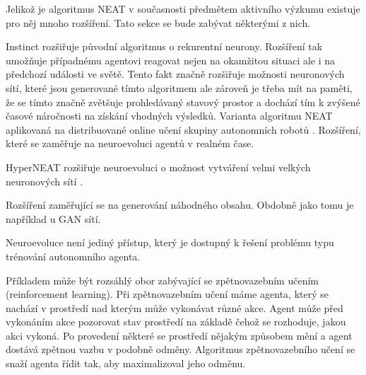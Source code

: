 Jelikož je algoritmus NEAT v současnosti předmětem aktivního výzkumu existuje pro něj mnoho rozšíření. Tato sekce se bude zabývat některými z nich.

Instinct rozšiřuje původní algoritmus o rekurentní neurony. Rozšíření tak umožňuje případnému agentovi reagovat nejen na okamžitou situaci ale i na předchozí události ve světě. Tento fakt značně rozšiřuje možnosti neuronových sítí, které jsou generované tímto algoritmem ale zároveň je třeba mít na paměti, že se tímto značně zvětšuje prohledávaný stavový prostor a dochází tím k zvýšené časové náročnosti na získání vhodných výsledků.
Varianta algoritmu NEAT aplikovaná na distribuované online učení skupiny autonomních robotů \cite[s.~1]{odNEAT}.
Rozšíření, které se zaměřuje na neuroevoluci agentů v realném čase.


HyperNEAT rozšiřuje neuroevoluci o možnost vytváření velmi velkých neuronových sítí \cite[s.~1]{hyperNEAT}.

Rozšíření zaměřující se na generování náhodného obsahu. Obdobně jako tomu je například u GAN sítí.

Neuroevoluce není jediný přístup, který je dostupný k řešení problému typu trénování autonomního agenta.

Příkladem může být rozsáhlý obor zabývající se zpětnovazebním učením (reinforcement learning). Při zpětnovazebním učení máme agenta, který se nachází v prostředí nad kterým může vykonávat různé akce. Agent může před vykonáním akce pozorovat stav prostředí na základě čehož se rozhoduje, jakou akci vykoná. Po provedení některé se prostředí nějakým způsobem mění a agent dostává zpětnou vazbu v podobně odměny. Algoritmus zpětnovazebního učení se snaží agenta řídit tak, aby maximalizoval jeho odměnu. 

